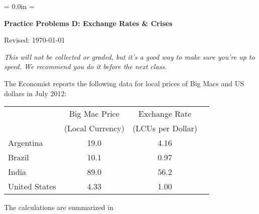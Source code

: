 \documentclass[12pt]{exam}
\def\HeadName{Practice Problems D}
\begin{document}
\parindent = 0.0in
\parskip = \bigskipamount
\thispagestyle{empty}%
\Head

\centerline{\large \bf \HeadName:  Exchange Rates \& Crises}
\centerline{Revised:  \today}

\medskip
{\it This will not be collected or graded,
but it's a good way to make sure you're up to speed.
We recommend you do it before the next class.}


\begin{questions}
The Economist reports the following data for
local prices of Big Macs and US dollars in July 2012:

\begin{center}
\begin{tabular}{lccc}
\toprule
        & Big Mac Price  &  Exchange Rate    \\
        &(Local Currency)&(LCUs per Dollar)   \\
\midrule
Argentina       &  19.0  &  4.16  \\
Brazil          &  10.1  &  0.97 \\
India           &  89.0  &  56.2   \\
United States   &  4.33  &  1.00   \\
\bottomrule
\end{tabular}
\end{center}
\medskip


\begin{solution}
The calculations are summarized in


\end{solution}
\end{questions}
\end{document}
